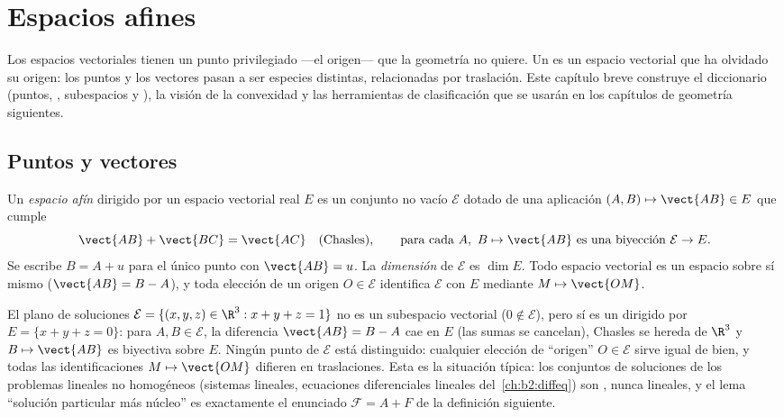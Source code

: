 \chapter{Espacios afines}\label{ch:b2:affine}

Los espacios vectoriales tienen un punto privilegiado ---el origen---
que la geometría no quiere. Un \emph{} es un espacio
vectorial que ha olvidado su origen: los puntos y los vectores pasan a
ser especies distintas, relacionadas por traslación. Este capítulo
breve construye el diccionario (puntos, , subespacios y
), la visión  de la convexidad y las
herramientas de clasificación que se usarán en los capítulos de
geometría siguientes.

\section{Puntos y vectores}

\begin{definition}\label{def:b2:affine:def}
Un \emph{espacio afín} dirigido por un espacio
vectorial real $E$ es un conjunto no vacío $\mathcal{E}$ dotado de
una aplicación $(A, B) \mapsto \vect{AB} \in E$ que cumple
\[
\vect{AB} + \vect{BC} = \vect{AC}
\quad \text{(Chasles)},
\qquad
\text{para cada } A,\ B \mapsto \vect{AB} \text{ es una biyección }
\mathcal{E} \to E .
\]
Se escribe $B = A + u$ para el único punto con $\vect{AB} = u$. La
\emph{dimensión} de $\mathcal{E}$ es $\dim E$. Todo espacio vectorial
es un espacio  sobre sí mismo ($\vect{AB} = B - A$), y toda
elección de un origen $O \in \mathcal{E}$ identifica $\mathcal{E}$
con $E$ mediante $M \mapsto \vect{OM}$.
\end{definition}

\begin{example}\label{ex:b2:affine:planeexample}
El plano de soluciones $\mathcal E = \{(x, y, z) \in \R^3 : x + y +
z = 1\}$ no es un subespacio vectorial ($0 \notin \mathcal E$), pero
sí es un  dirigido por $E = \{x + y + z = 0\}$: para $A,
B \in \mathcal E$, la diferencia $\vect{AB} = B - A$ cae en $E$ (las
sumas se cancelan), Chasles se hereda de $\R^3$ y $B \mapsto
\vect{AB}$ es biyectiva sobre $E$. Ningún punto de $\mathcal E$ está
distinguido: cualquier elección de ``origen'' $O \in \mathcal E$
sirve igual de bien, y todas las identificaciones $M \mapsto
\vect{OM}$ difieren en traslaciones. Esta es la situación típica: los
conjuntos de soluciones de los problemas lineales no homogéneos
(sistemas lineales, ecuaciones diferenciales lineales del~\cref{ch:b2:diffeq}) son , nunca lineales, y el lema ``solución
particular más núcleo'' es exactamente el enunciado $\mathcal F = A +
F$ de la definición siguiente.
\end{example}

